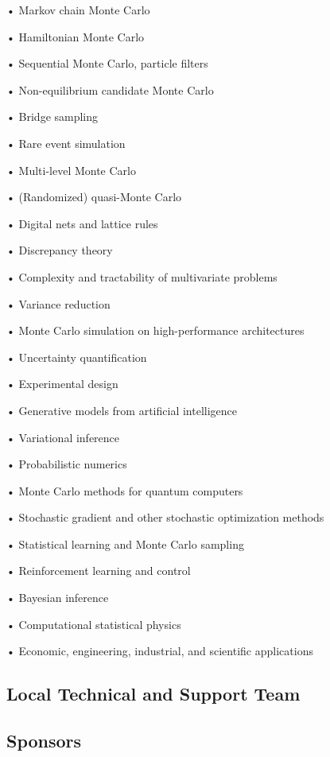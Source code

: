 \setlength{\columnsep}{1cm}
\begin{multicols}{2}
\raggedright
• Markov chain Monte Carlo

• Hamiltonian Monte Carlo

• Sequential Monte Carlo, particle filters

• Non-equilibrium candidate Monte Carlo

• Bridge sampling

• Rare event simulation

• Multi-level Monte Carlo

• (Randomized) quasi-Monte Carlo

• Digital nets and lattice rules

• Discrepancy theory

• Complexity and tractability of multivariate problems

• Variance reduction

• Monte Carlo simulation on high-performance architectures

• Uncertainty quantification

• Experimental design

• Generative models from artificial intelligence

• Variational inference

• Probabilistic numerics

• Monte Carlo methods for quantum computers

• Stochastic gradient and other stochastic optimization methods

• Statistical learning and Monte Carlo sampling

• Reinforcement learning and control

• Bayesian inference

• Computational statistical physics

• Economic, engineering, industrial, and scientific applications

\end{multicols}


\subsection{Local Technical and Support Team}


\subsection{Sponsors}

